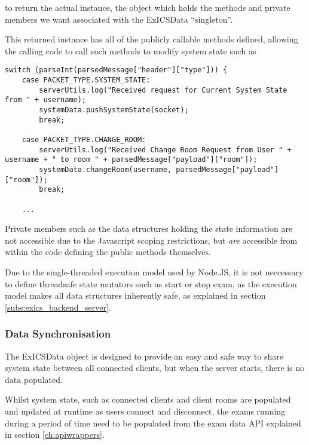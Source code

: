 \FloatBarrier

to return the actual instance, the object which holds the methods and private members we want associated with the ExICSData ``singleton''.

This returned instance has all of the publicly callable methods defined, allowing the calling code to call such methods to modify system state such as

\FloatBarrier

\lstset{language=JavaScript}
\begin{lstlisting}[tabsize=2,
		breaklines=true]
switch (parseInt(parsedMessage["header"]["type"])) {
	case PACKET_TYPE.SYSTEM_STATE:
		serverUtils.log("Received request for Current System State from " + username);
		systemData.pushSystemState(socket);
		break;

	case PACKET_TYPE.CHANGE_ROOM:
		serverUtils.log("Received Change Room Request from User " + username + " to room " + parsedMessage["payload"]["room"]);
		systemData.changeRoom(username, parsedMessage["payload"]["room"]);
		break;

	...
\end{lstlisting}

\FloatBarrier

Private members such as the data structures holding the state information are not accessible due to the Javascript scoping restrictions, but \textit{are} accessible from within the code defining the public methods themselves.

Due to the single-threaded execution model used by Node.JS, it is not neccessary to define threadsafe state mutators such as start or stop exam, as the execution model makes all data structures inherently safe, as explained in section \ref{subs:exics_backend_server}.

\subsubsection{Data Synchronisation}

\FloatBarrier

The ExICSData object is designed to provide an easy and safe way to share system state between all connected clients, but when the server starts, there is no data populated.

Whilst system state, such as connected clients and client rooms are populated and updated at runtime as users connect and disconnect, the exams running during a period of time need to be populated from the exam data API explained in section \ref{ch:apiwrappers}.

